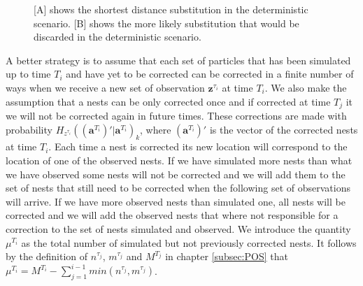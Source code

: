 \documentclass[11pt,a4paper]{article}
\renewcommand{\vec}[1]{\mathbf{#1}}
\begin{document}
{{\begin{figure}
\centering
\caption{[A] shows the shortest distance substitution in the deterministic scenario. [B] shows the more likely substitution that would be discarded in the deterministic scenario.}
\label{fig:1}
\end{figure}

A better strategy is to assume that each set of particles that has been simulated up to time $T_i$ and have yet to be corrected can be corrected in a finite number of ways when we receive a new set of observation $\vec{z}^{\tau_i}$ at time $T_i$. We also make the assumption that a nests can be only corrected once and if corrected at time $T_j$ it we will not be corrected again in future times. These corrections are made with probability $H_{z^{\tau_i}}((\vec{a}^{T_i})' | \vec{a}^{T_i})_k$, where $(\vec{a}^{T_i})'$ is the vector of the corrected nests at time $T_i$. Each time a nest is corrected its new location will correspond to the location of one of the observed nests. If we have simulated more nests than what we have observed some nests will not be corrected and we will add them to the set of nests that still need to be corrected when the following set of observations will arrive. If we have more observed nests than simulated one, all nests will be corrected and we will add the observed nests that where not responsible for a correction to the set of nests simulated and observed. We introduce the quantity $\mu^{T_i}$ as the total number of simulated but not previously corrected nests. It follows by the definition of $n^{\tau_j}$, $m^{\tau_j}$ and $M^{T_j}$ in chapter \ref{subsec:POS} that $\mu^{T_i} = M^{T_i} - \sum_{j=1}^{i-1} min(n^{\tau_j}, m^{\tau_j})$.

}}
\end{document}
